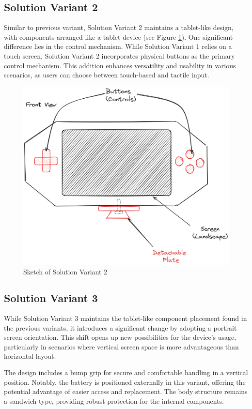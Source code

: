 \subsection{Solution Variant 2}
Similar to previous variant, Solution Variant 2 maintains a tablet-like design, with components arranged like a tablet device (see Figure \ref{fig:sketch-solution-variant-2}). One significant difference lies in the control mechanism. While Solution Variant 1 relies on a touch screen, Solution Variant 2 incorporates physical buttons as the primary control mechanism. This addition enhances versatility and usability in various scenarios, as users can choose between touch-based and tactile input.

\begin{figure}[H]
    \centering
    \includegraphics[width=0.55\linewidth]{texs/Part1/chapter3/image/v2.png}
    \caption{Sketch of Solution Variant 2}
    \label{fig:sketch-solution-variant-2}
\end{figure}

\subsection{Solution Variant 3}
While Solution Variant 3 maintains the tablet-like component placement found in the previous variants, it introduces a significant change by adopting a portrait screen orientation. This shift opens up new possibilities for the device's usage, particularly in scenarios where vertical screen space is more advantageous than horizontal layout.

The design includes a bump grip for secure and comfortable handling in a vertical position. Notably, the battery is positioned externally in this variant, offering the potential advantage of easier access and replacement. The body structure remains a sandwich-type, providing robust protection for the internal components.

